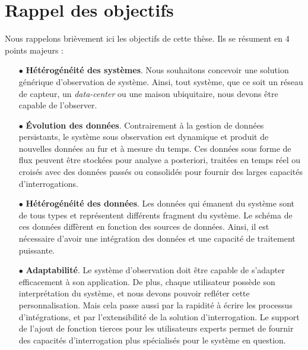 \section{Rappel des objectifs}\label{sec:conclusion:objectifs}
Nous rappelons brièvement ici les objectifs de cette thèse. Ils se résument en 4 points majeurs :
\begin{itemize}
	\item[$\bullet$] \textbf{Hétérogénéité des systèmes}. Nous souhaitons concevoir une solution générique d'observation de système. Ainsi, tout système, que ce soit un réseau de capteur, un \textit{data-center} ou une maison ubiquitaire, nous devons être capable de l'observer.
	\item[$\bullet$] \textbf{Évolution des données}. Contrairement à la gestion de données persistants, le système sous observation est dynamique et produit de nouvelles données au fur et à mesure du temps. Ces données sous forme de flux peuvent être stockées pour analyse a posteriori, traitées en temps réel ou croisés avec des données passés ou consolidés pour fournir des larges capacités d'interrogations.
	\item[$\bullet$] \textbf{Hétérogénéité des données}. Les données qui émanent du système sont de tous types et représentent différents fragment du système. Le schéma de ces données diffèrent en fonction des sources de données. Ainsi, il est nécessaire d'avoir une intégration des données et une capacité de traitement puissante.
	\item[$\bullet$] \textbf{Adaptabilité}. Le système d'observation doit être capable de s'adapter efficacement à son application. De plus, chaque utilisateur possède son interprétation du système, et nous devons pouvoir refléter cette personnalisation. Mais cela passe aussi par la rapidité à écrire les processus d'intégrations, et par l'extensibilité de la solution d'interrogation. Le support de l'ajout de fonction tierces pour les utilisateurs experts permet de fournir des capacités d'interrogation plus spécialisés pour le système en question.
\end{itemize}